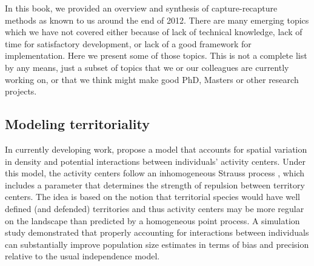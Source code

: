 In this book, we provided an overview and synthesis of
capture-recapture methods as known to us around the end of 2012. There
are many emerging topics which we have not covered either because of
lack of technical knowledge, lack of time for satisfactory
development, or lack of a good framework for implementation. Here we
present some of those topics. This is not a complete list by any means,
just a subset of topics that we or our colleagues are currently working on, or that we think
might make good PhD, Masters or other research projects.


\subsection{Modeling territoriality}
\label{last.sec.ipp}

In currently developing work, \citet{reich_etal:2012} propose a model
that accounts for spatial variation in %
density and
potential interactions between individuals' activity centers.
Under this model,
the activity centers follow an inhomogeneous Strauss process
\citep{strauss:1975}, which %
includes a parameter that determines the strength
of repulsion between territory centers. %
The idea is based on the notion
that territorial species would have well defined (and defended)
territories
and thus activity centers may be more regular on the landscape
than predicted by a homogeneous point process.
A simulation study demonstrated %
that properly accounting for
interactions between individuals can %
substantially improve
population size estimates in terms of bias and precision relative to
the usual independence model. %

